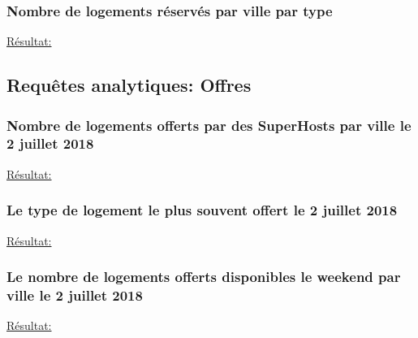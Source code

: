 \documentclass[11pt]{article}
\begin{document}
\subsubsection*{Nombre de logements réservés par ville par type}

\underline{Résultat:}


\subsection*{Requêtes analytiques: Offres}
\subsubsection*{Nombre de logements offerts par des SuperHosts par ville le 2 juillet 2018}

\underline{Résultat:}

\subsubsection*{Le type de logement le plus souvent offert le 2 juillet 2018}

\underline{Résultat:}

\subsubsection*{Le nombre de logements offerts disponibles le weekend par ville le 2 juillet 2018}

\underline{Résultat:}

\end{document}
